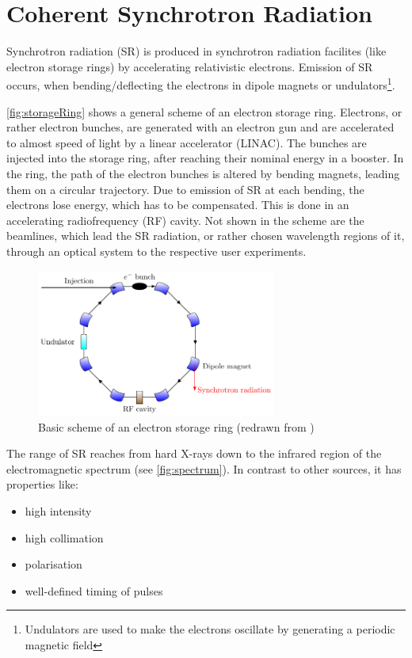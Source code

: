 \section{Coherent Synchrotron Radiation}
Synchrotron radiation (SR) is produced in synchrotron radiation facilites (like electron storage rings) by accelerating relativistic electrons. Emission of  SR occurs, when bending/deflecting the electrons in dipole magnets or undulators\footnote{Undulators are used to make the electrons oscillate by generating a periodic magnetic field}. 

\autoref{fig:storageRing} shows a general scheme of an electron storage ring. Electrons, or rather electron bunches, are generated with an electron gun and are accelerated to almost speed of light by a linear accelerator (LINAC). The bunches are injected into the storage ring, after reaching their nominal energy in a booster. In the ring, the path of the electron bunches is altered by bending magnets, leading them on a circular trajectory. Due to emission of SR at each bending, the electrons lose energy, which has to be compensated. This is done in an accelerating radiofrequency (RF) cavity. Not shown in the scheme are the beamlines, which lead the SR radiation, or rather chosen wavelength regions of it, through an optical system to the respective user experiments.\cite{roussel2014} \cite{rota2018}

 \begin{figure}[H]
 	\centering
 	\includegraphics[width=0.7\textwidth]{chap/02-theory/img/synchrotron}
 	\caption{Basic scheme of an electron storage ring (redrawn from \cite{roussel2014})}
 	\label{fig:storageRing}
 \end{figure}
The range of SR reaches from hard X-rays down to the infrared region of the electromagnetic spectrum (see \autoref{fig:spectrum}). In contrast to other sources, it has properties like:
\begin{itemize}[noitemsep]
	\item high intensity 
	\item high collimation
	\item polarisation
	\item well-defined timing of pulses
\end{itemize}


